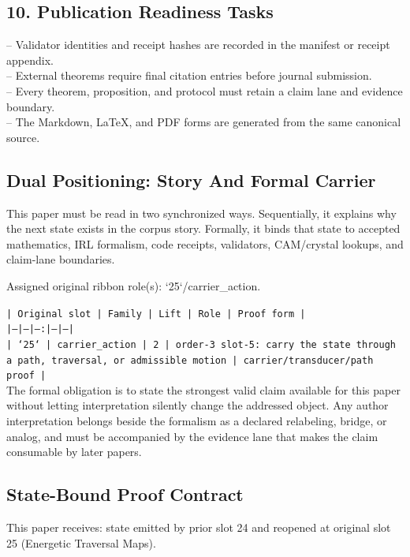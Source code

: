 \documentclass[11pt]{article}
\begin{document}
\subsection*{10. Publication Readiness Tasks}

\noindent{}-- Validator identities and receipt hashes are recorded in the manifest or receipt appendix.\\
\noindent{}-- External theorems require final citation entries before journal submission.\\
\noindent{}-- Every theorem, proposition, and protocol must retain a claim lane and evidence boundary.\\
\noindent{}-- The Markdown, LaTeX, and PDF forms are generated from the same canonical source.\\

\subsection*{Dual Positioning: Story And Formal Carrier}

This paper must be read in two synchronized ways. Sequentially, it explains why
the next state exists in the corpus story. Formally, it binds that state to
accepted mathematics, IRL formalism, code receipts, validators, CAM/crystal
lookups, and claim-lane boundaries.

Assigned original ribbon role(s): `25`/carrier\_action.

\noindent\texttt{| Original slot | Family | Lift | Role | Proof form |}\\
\noindent\texttt{|---|---|---:|---|---|}\\
\noindent\texttt{| `25` | carrier\_action | 2 | order-3 slot-5: carry the state through a path, traversal, or admissible motion | carrier/transducer/path proof |}\\

The formal obligation is to state the strongest valid claim available for this
paper without letting interpretation silently change the addressed object. Any
author interpretation belongs beside the formalism as a declared relabeling,
bridge, or analog, and must be accompanied by the evidence lane that makes the
claim consumable by later papers.

\subsection*{State-Bound Proof Contract}

This paper receives: state emitted by prior slot 24 and reopened at original slot 25 (Energetic Traversal Maps).
\end{document}
